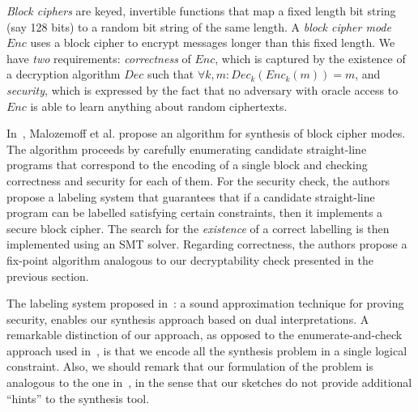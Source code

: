 \documentclass[preprint]{sig-alternate-05-2015}
\begin{document}
{\em{Block ciphers}} are keyed, invertible
functions that map a fixed length bit string (say 128 bits) to a random bit string
of the same length. A {\em{block cipher mode}} $Enc$ uses a block cipher to encrypt
messages longer than this fixed length. We have {\em{two}} requirements:
{\em{correctness}} of $Enc$, which is captured by the
existence of a decryption algorithm $Dec$ such that $\forall k, m : Dec_k(
Enc_k( m ) ) = m$, and {\em{security}}, which is expressed by the fact that no adversary with
oracle access to $Enc$ is able to learn anything about random ciphertexts.

In~\cite{DBLP:conf/csfw/MalozemoffKG14}, Malozemoff et al. propose
an algorithm for synthesis of block cipher modes.
The algorithm proceeds by carefully enumerating candidate straight-line programs
that correspond to the encoding of a single block and checking
correctness and security for each of them.
For the security check, the authors propose a 
labeling system that guarantees that if a candidate straight-line program
can be labelled satisfying certain constraints, 
then it implements a secure block cipher.
The search for the {\em existence} of a correct labelling
is then implemented using an SMT solver.
Regarding correctness, the authors propose a
fix-point algorithm analogous to our decryptability check presented in the previous
section.

The labeling system proposed in~\cite{DBLP:conf/csfw/MalozemoffKG14}:
a sound approximation technique for proving security,
enables our synthesis approach based on dual interpretations.
A remarkable distinction of our approach, as opposed to the
enumerate-and-check approach used in~\cite{DBLP:conf/csfw/MalozemoffKG14},
is that we encode all the synthesis problem in a single logical constraint.
Also, we should remark that our formulation of the problem 
is analogous to the one in~\cite{DBLP:conf/csfw/MalozemoffKG14},
in the sense that our sketches do not provide 
additional ``hints'' to the synthesis tool.

\end{document}
